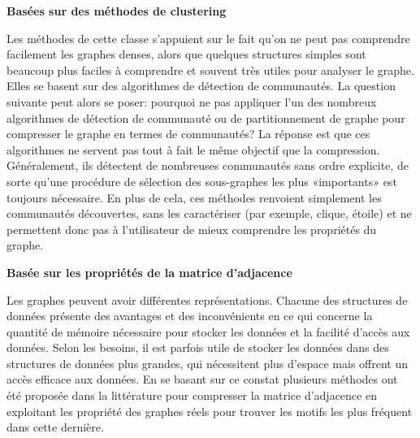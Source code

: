 \documentclass[a4paper,oneside,12pt]{report}
\theoremstyle{definition}
\begin{document}
					 \textbf{Basées sur des méthodes de clustering}
							
							Les méthodes de cette classe s'appuient sur le fait qu'on ne peut pas comprendre facilement les graphes denses, alors que quelques structures simples sont beaucoup plus faciles à comprendre et souvent très utiles pour analyser le graphe. Elles se basent sur des algorithmes de détection de communautés. 
							La question suivante peut alors se poser: pourquoi ne pas appliquer l'un des nombreux algorithmes de détection de communauté ou de partitionnement de graphe pour compresser le graphe en termes de communautés? La réponse est que ces algorithmes ne servent pas tout à fait le même objectif que la compression. Généralement, ils détectent de nombreuses communautés sans ordre explicite, de sorte qu'une procédure de sélection des sous-graphes les plus «importants» est toujours nécessaire. En plus de cela, ces méthodes renvoient simplement les communautés découvertes, sans les caractériser (par exemple, clique, étoile) et ne permettent donc pas à l'utilisateur de mieux comprendre les propriétés du graphe. 
							
							
							
							
							
							
			
					 \textbf{Basée sur les propriétés de la matrice d'adjacence}
							
							Les graphes peuvent avoir différentes représentations. Chacune des structures de données présente des avantages et des inconvénients en ce qui concerne la quantité de mémoire nécessaire pour stocker les données et la facilité d'accès aux données. Selon les besoins, il est parfois utile de stocker les données dans des structures de données plus grandes, qui nécessitent plus d'espace mais offrent un accès efficace aux données. En se basant sur ce constat plusieurs méthodes ont été  proposée dans la littérature pour compresser la matrice d'adjacence en exploitant les propriété des graphes réels pour trouver les motifs les plus fréquent dans cette dernière.
							
							
							
					
\end{document}
